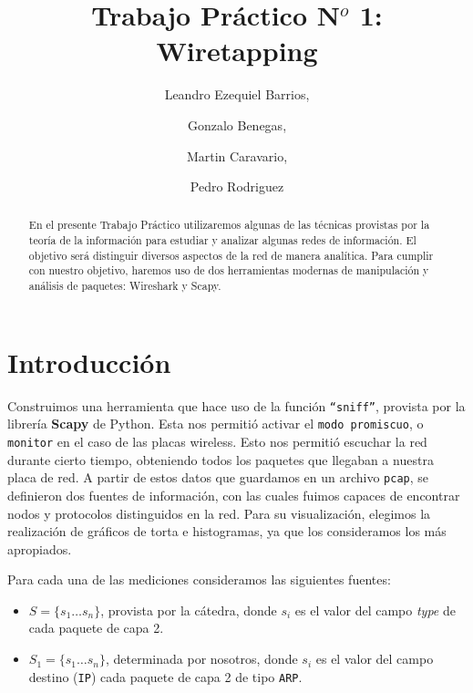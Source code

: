 \documentclass[final,inline,a4paper,narroweqnarray]{ieee}
\begin{document}
\title[TP N$^o$ 1: Wiretapping]{%
Trabajo Práctico N$^o$ 1: Wiretapping}

\author[Barrios, Benegas, Caravario, Rodriguez]{%
	Leandro Ezequiel Barrios,
	\and
	Gonzalo Benegas,
	\and
	Martin Caravario, 
	\and
	Pedro Rodriguez 
}

\maketitle

\begin{abstract}

En el presente Trabajo Práctico utilizaremos algunas de las técnicas
provistas por la teoría de la información para estudiar y analizar
algunas redes de información. El objetivo será distinguir diversos
aspectos de la red de manera analítica. Para cumplir con nuestro
objetivo, haremos uso de dos herramientas modernas de manipulación y
análisis de paquetes: Wireshark y Scapy.

\end{abstract}


\section{ Introducción }

Construimos una herramienta que hace uso de la función
\texttt{``sniff''}, provista por la librería \textbf{Scapy} de
Python. Esta nos permitió activar el \texttt{modo promiscuo}, o
\texttt{monitor} en el caso de las placas wireless. Esto nos permitió
escuchar la red durante cierto tiempo, obteniendo todos los paquetes
que llegaban a nuestra placa de red. A partir de estos datos que
guardamos en un archivo \texttt{pcap}, se definieron dos fuentes de
información, con las cuales fuimos capaces de encontrar nodos y
protocolos distinguidos en la red. Para su visualización, elegimos la
realización de gráficos de torta e histogramas, ya que los
consideramos los más apropiados.

Para cada una de las mediciones consideramos las siguientes fuentes: 
\begin{itemize}

  \item $S = \{s_{1} \dots s_{n}\}$, provista por la cátedra, donde
  $s_{i}$ es el valor del campo \emph{type} de cada paquete de capa
  2.

  \item $S_{1} = \{s_{1} \dots s_{n}\} $, determinada por nosotros,
  donde $s_i$ es el valor del campo destino (\texttt{IP}) cada paquete
  de capa 2 de tipo \texttt{ARP}.

\end{itemize}
\end{document}
